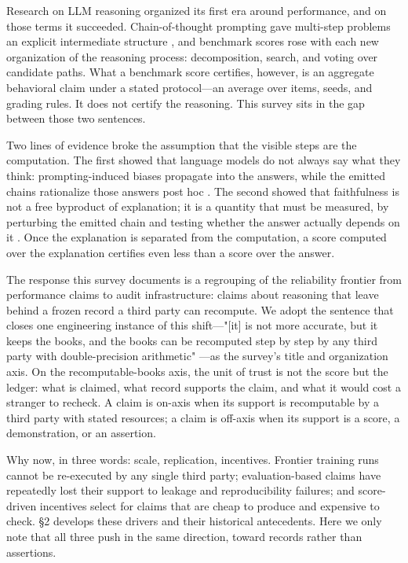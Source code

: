 \documentclass[11pt,a4paper]{article}
\begin{document}
Research on LLM reasoning organized its first era around performance, and on those terms it succeeded. Chain-of-thought prompting gave multi-step problems an explicit intermediate structure \cite{key01}, and benchmark scores rose with each new organization of the reasoning process: decomposition, search, and voting over candidate paths. What a benchmark score certifies, however, is an aggregate behavioral claim under a stated protocol—an average over items, seeds, and grading rules. It does not certify the reasoning. This survey sits in the gap between those two sentences.

Two lines of evidence broke the assumption that the visible steps are the computation. The first showed that language models do not always say what they think: prompting-induced biases propagate into the answers, while the emitted chains rationalize those answers post hoc \cite{key02}. The second showed that faithfulness is not a free byproduct of explanation; it is a quantity that must be measured, by perturbing the emitted chain and testing whether the answer actually depends on it \cite{key03}. Once the explanation is separated from the computation, a score computed over the explanation certifies even less than a score over the answer.

The response this survey documents is a regrouping of the reliability frontier from performance claims to audit infrastructure: claims about reasoning that leave behind a frozen record a third party can recompute. We adopt the sentence that closes one engineering instance of this shift—"[it] is not more accurate, but it keeps the books, and the books can be recomputed step by step by any third party with double-precision arithmetic" \cite{key04}—as the survey's title and organization axis. On the recomputable-books axis, the unit of trust is not the score but the ledger: what is claimed, what record supports the claim, and what it would cost a stranger to recheck. A claim is on-axis when its support is recomputable by a third party with stated resources; a claim is off-axis when its support is a score, a demonstration, or an assertion.

Why now, in three words: scale, replication, incentives. Frontier training runs cannot be re-executed by any single third party; evaluation-based claims have repeatedly lost their support to leakage and reproducibility failures; and score-driven incentives select for claims that are cheap to produce and expensive to check. §2 develops these drivers and their historical antecedents. Here we only note that all three push in the same direction, toward records rather than assertions.
\end{document}
